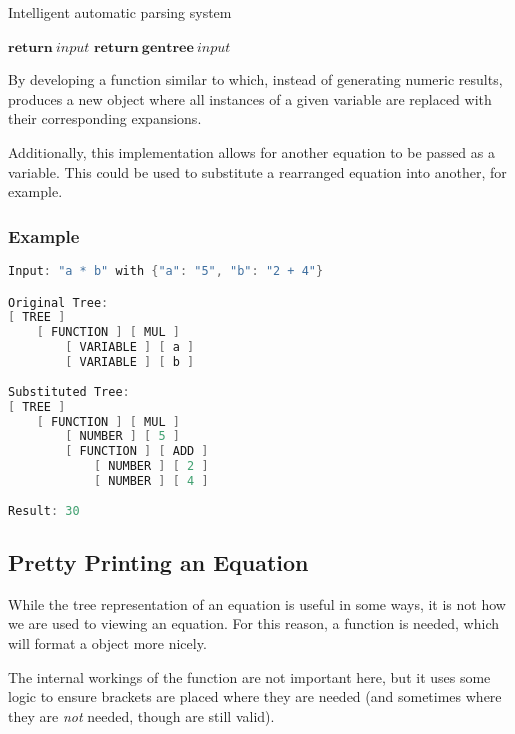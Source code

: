 \documentclass[12pt]{article}
\begin{document}
\begin{algorithm}
\caption{Intelligent automatic parsing system}\label{treegenalg}
\begin{algorithmic}[1]
		\State $\textbf{return} \ \textit{input}$ 
	\Else
		\State $\textbf{return} \ \textbf{gentree} \ \textit{input}$ 
	\EndIf
\EndFunction
\end{algorithmic}
\end{algorithm}

By developing a function similar to  which, instead of generating numeric results, produces a new  object where all instances of a given variable are replaced with their corresponding expansions.

Additionally, this implementation allows for another equation to be passed as a variable. This could be used to substitute a rearranged equation into another, for example.

\subsubsection{Example}
\begin{lstlisting}[language=C++]
Input: "a * b" with {"a": "5", "b": "2 + 4"}

Original Tree:
[ TREE ]
    [ FUNCTION ] [ MUL ]
        [ VARIABLE ] [ a ]
        [ VARIABLE ] [ b ]
        
Substituted Tree:
[ TREE ]
    [ FUNCTION ] [ MUL ]
        [ NUMBER ] [ 5 ]
        [ FUNCTION ] [ ADD ]
            [ NUMBER ] [ 2 ]
            [ NUMBER ] [ 4 ]
        
Result: 30
\end{lstlisting}

\subsection{Pretty Printing an Equation}

While the tree representation of an equation is useful in some ways, it is not how we are used to viewing an equation. For this reason, a  function is needed, which will format a  object more nicely.

The internal workings of the function are not important here, but it uses some logic to ensure brackets are placed where they are needed (and sometimes where they are \textit{not} needed, though are still valid).
\end{document}
